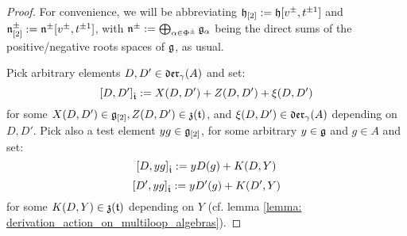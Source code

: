             \begin{proof}
                For convenience, we will be abbreviating $\mathfrak{h}_{[2]} := \mathfrak{h}[v^{\pm}, t^{\pm 1}]$ and $\mathfrak{n}^{\pm}_{[2]} := \mathfrak{n}^{\pm}[v^{\pm}, t^{\pm 1}]$, with $\mathfrak{n}^{\pm} := \bigoplus_{\alpha \in \Phi^{\pm}} \mathfrak{g}_{\alpha}$ being the direct sums of the positive/negative roots spaces of $\mathfrak{g}$, as usual.
            
                Pick arbitrary elements $D, D' \in \mathfrak{der}_{\gamma}(A)$ and set:
                    $$[D, D']_{\hat{\mathfrak{t}}} := X(D, D') + Z(D, D') + \xi(D, D')$$
                for some $X(D, D') \in \mathfrak{g}_{[2]}, Z(D, D') \in \mathfrak{z}(\mathfrak{t})$, and $\xi(D, D') \in \mathfrak{der}_{\gamma}(A)$ depending on $D, D'$. Pick also a test element $y g \in \mathfrak{g}_{[2]}$, for some arbitrary $y \in \mathfrak{g}$ and $g \in A$ and set:
                    $$[D, y g]_{\hat{\mathfrak{t}}} := y D( g ) + K(D, Y)$$
                    $$[D', y g]_{\hat{\mathfrak{t}}} := y D'( g ) + K(D', Y)$$
                for some $K(D, Y) \in \mathfrak{z}(\mathfrak{t})$ depending on $Y$ (cf. lemma \ref{lemma: derivation_action_on_multiloop_algebras}).
                

\end{proof}
